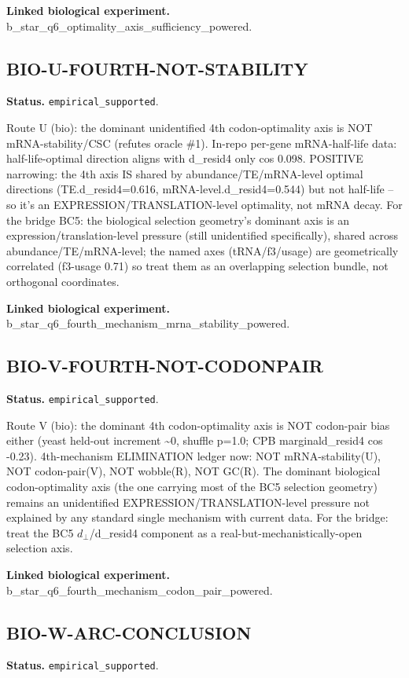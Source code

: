 \textbf{Linked biological experiment.} b\_star\_q6\_optimality\_axis\_sufficiency\_powered.

\subsection{BIO-U-FOURTH-NOT-STABILITY}
\textbf{Status.} \texttt{empirical\_supported}.

Route U (bio): the dominant unidentified 4th codon-optimality axis is NOT mRNA-stability/CSC
(refutes oracle \#1). In-repo per-gene mRNA-half-life data: half-life-optimal direction aligns with
d\_resid4 only cos 0.098. POSITIVE narrowing: the 4th axis IS shared by abundance/TE/mRNA-level
optimal directions (TE.d\_resid4=0.616, mRNA-level.d\_resid4=0.544) but not half-life -- so it's an
EXPRESSION/TRANSLATION-level optimality, not mRNA decay. For the bridge BC5: the biological
selection geometry's dominant axis is an expression/translation-level pressure (still unidentified
specifically), shared across abundance/TE/mRNA-level; the named axes (tRNA/f3/usage) are
geometrically correlated (f3-usage 0.71) so treat them as an overlapping selection bundle, not
orthogonal coordinates.

\textbf{Linked biological experiment.} b\_star\_q6\_fourth\_mechanism\_mrna\_stability\_powered.

\subsection{BIO-V-FOURTH-NOT-CODONPAIR}
\textbf{Status.} \texttt{empirical\_supported}.

Route V (bio): the dominant 4th codon-optimality axis is NOT codon-pair bias either (yeast held-out
increment \textasciitilde{}0, shuffle p=1.0; CPB marginald\_resid4 cos -0.23). 4th-mechanism
ELIMINATION ledger now: NOT mRNA-stability(U), NOT codon-pair(V), NOT wobble(R), NOT GC(R). The
dominant biological codon-optimality axis (the one carrying most of the BC5 selection geometry)
remains an unidentified EXPRESSION/TRANSLATION-level pressure not explained by any standard single
mechanism with current data. For the bridge: treat the BC5 $d_{\perp}$/d\_resid4 component as a
real-but-mechanistically-open selection axis.

\textbf{Linked biological experiment.} b\_star\_q6\_fourth\_mechanism\_codon\_pair\_powered.

\subsection{BIO-W-ARC-CONCLUSION}
\textbf{Status.} \texttt{empirical\_supported}.

